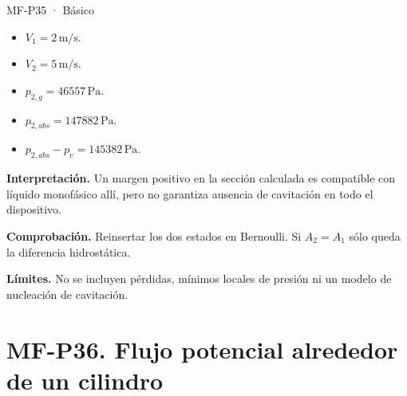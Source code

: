 \begin{studiumworked}{MF-P35 · Básico}
\begin{itemize}
\item $V_1=2\,\mathrm{m/s}$.

\item $V_2=5\,\mathrm{m/s}$.

\item $p_{2,g}=46557\,\mathrm{Pa}$.

\item $p_{2,abs}=147882\,\mathrm{Pa}$.

\item $p_{2,abs}-p_v=145382\,\mathrm{Pa}$.

\end{itemize}

\textbf{Interpretación.} Un margen positivo en la sección calculada es compatible con líquido monofásico allí, pero no garantiza ausencia de cavitación en todo el dispositivo.

\textbf{Comprobación.} Reinsertar los dos estados en Bernoulli. Si $A_2=A_1$ sólo queda la diferencia hidrostática.

\textbf{Límites.} No se incluyen pérdidas, mínimos locales de presión ni un modelo de nucleación de cavitación.

\end{studiumworked}



\Needspace{.30\textheight}\section{MF-P36. Flujo potencial alrededor de un cilindro}

